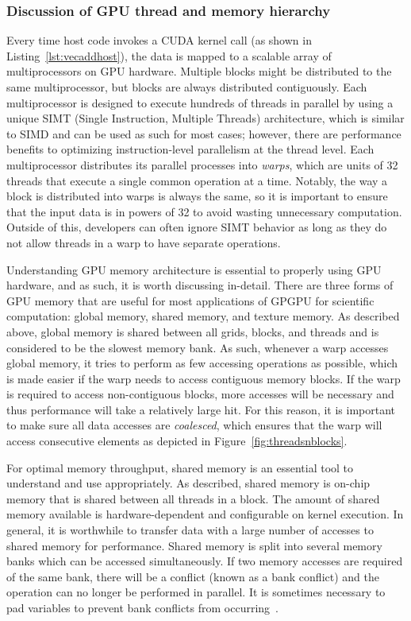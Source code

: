 \subsubsection{Discussion of GPU thread and memory hierarchy}

Every time host code invokes a CUDA kernel call (as shown in Listing~\ref{lst:vecaddhost}), the data is mapped to a scalable array of multiprocessors on GPU hardware.
Multiple blocks might be distributed to the same multiprocessor, but blocks are always distributed contiguously.
Each multiprocessor is designed to execute hundreds of threads in parallel by using a unique SIMT (Single Instruction, Multiple Threads) architecture, which is similar to SIMD and can be used as such for most cases; however, there are performance benefits to optimizing instruction-level parallelism at the thread level.
Each multiprocessor distributes its parallel processes into \textit{warps}, which are units of 32 threads that execute a single common operation at a time.
Notably, the way a block is distributed into warps is always the same, so it is important to ensure that the input data is in powers of 32 to avoid wasting unnecessary computation.
Outside of this, developers can often ignore SIMT behavior as long as they do not allow threads in a warp to have separate operations.

Understanding GPU memory architecture is essential to properly using GPU hardware, and as such, it is worth discussing in-detail.
There are three forms of GPU memory that are useful for most applications of GPGPU for scientific computation: global memory, shared memory, and texture memory.
As described above, global memory is shared between all grids, blocks, and threads and is considered to be the slowest memory bank.
As such, whenever a warp accesses global memory, it tries to perform as few accessing operations as possible, which is made easier if the warp needs to access contiguous memory blocks.
If the warp is required to access non-contiguous blocks, more accesses will be necessary and thus performance will take a relatively large hit.
For this reason, it is important to make sure all data accesses are \textit{coalesced}, which ensures that the warp will access consecutive elements as depicted in Figure~\ref{fig:threadsnblocks}.

For optimal memory throughput, shared memory is an essential tool to understand and use appropriately.
As described, shared memory is on-chip memory that is shared between all threads in a block.
The amount of shared memory available is hardware-dependent and configurable on kernel execution.
In general, it is worthwhile to transfer data with a large number of accesses to shared memory for performance.
Shared memory is split into several memory banks which can be accessed simultaneously.
If two memory accesses are required of the same bank, there will be a conflict (known as a bank conflict) and the operation can no longer be performed in parallel.
It is sometimes necessary to pad variables to prevent bank conflicts from occurring~\cite{harris2013}.


